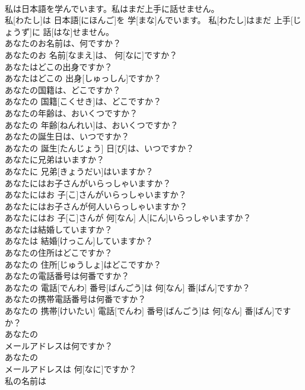 \documentclass[8pt]{extreport}
\begin{document}
\begin{CJK}{UTF8}{min}
\\	私は日本語を学んでいます。私はまだ上手に話せません。 
\\	私[わたし]は 日本語[にほんご]を 学[まな]んでいます。 私[わたし]はまだ 上手[じょうず]に 話[はな]せません。	
\\	あなたのお名前は、何ですか？
\\	あなたのお 名前[なまえ]は、 何[なに]ですか？	
\\	あなたはどこの出身ですか？
\\	あなたはどこの 出身[しゅっしん]ですか？	
\\	あなたの国籍は、どこですか？
\\	あなたの 国籍[こくせき]は、どこですか？	
\\	あなたの年齢は、おいくつですか？
\\	あなたの 年齢[ねんれい]は、おいくつですか？	
\\	あなたの誕生日は、いつですか？ 
\\	あなたの 誕生[たんじょう] 日[び]は、いつですか？	
\\	あなたに兄弟はいますか？ 
\\	あなたに 兄弟[きょうだい]はいますか？	
\\	あなたにはお子さんがいらっしゃいますか？ 
\\	あなたにはお 子[こ]さんがいらっしゃいますか？	
\\	あなたにはお子さんが何人いらっしゃいますか？ 
\\	あなたにはお 子[こ]さんが 何[なん] 人[にん]いらっしゃいますか？	
\\	あなたは結婚していますか？
\\	あなたは 結婚[けっこん]していますか？	
\\	あなたの住所はどこですか？
\\	あなたの 住所[じゅうしょ]はどこですか？	
\\	あなたの電話番号は何番ですか？
\\	あなたの 電話[でんわ] 番号[ばんごう]は 何[なん] 番[ばん]ですか？	
\\	あなたの携帯電話番号は何番ですか？
\\	あなたの 携帯[けいたい] 電話[でんわ] 番号[ばんごう]は 何[なん] 番[ばん]ですか？	
\\	あなたの
\\	メールアドレスは何ですか？
\\	あなたの
\\	メールアドレスは 何[なに]ですか？	
\\	私の名前は 

\end{CJK}
\end{document}
